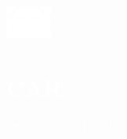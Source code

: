 \documentclass[../main.tex]{subfiles}
\begin{document}
\hspace*{0.2cm}
    \begin{minipage}[t]{2cm}
        \vspace*{0.9cm}\includegraphics[width=1.5cm]{assets/car.png}
    \end{minipage}
    \begin{minipage}[t]{5cm}
    
        \vspace*{0.75cm}
        \section*{\textcolor{white}{CAR}}
        \vspace*{-0.25cm}
        \textcolor{white}{
            Driver's license B [2019]
        }
    \end{minipage}
\end{document}
